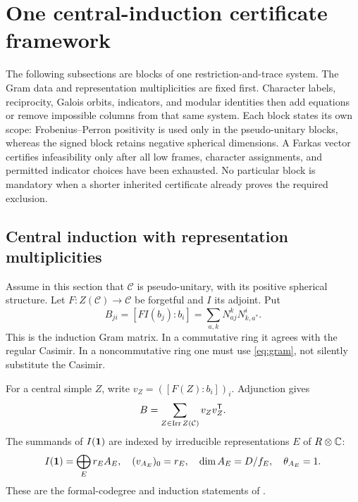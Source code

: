 \section{One central-induction certificate framework}\label{sec:unified-induction}
The following subsections are blocks of one restriction-and-trace system.
The Gram data and representation multiplicities are fixed first. Character
labels, reciprocity, Galois orbits, indicators, and modular identities then
add equations or remove impossible columns from that same system.
Each block states its own scope: Frobenius--Perron positivity is used only
in the pseudo-unitary blocks, whereas the signed block retains negative
spherical dimensions. A Farkas vector certifies infeasibility only after
all low frames, character assignments, and permitted indicator choices
have been exhausted. No particular block is mandatory when a shorter
inherited certificate already proves the required exclusion.

\subsection{Central induction with representation multiplicities}\label{sec:weighted}
Assume in this section that $\mathcal C$ is pseudo-unitary, with its
positive spherical structure. Let $F:Z(\mathcal C)\to\mathcal C$ be
forgetful and $I$ its adjoint. Put
\begin{equation}\label{eq:gram}
 B_{ji}=[FI(b_j):b_i]
 =\sum_{a,k}N_{aj}^{k}N_{k,a^*}^{i}.
\end{equation}
This is the induction Gram matrix. In a commutative ring it agrees with
the regular Casimir. In a noncommutative ring one must use
\eqref{eq:gram}, not silently substitute the Casimir.

For a central simple $Z$, write $v_Z=([F(Z):b_i])_i$. Adjunction gives
\begin{equation}\label{eq:fullgram}
 B=\sum_{Z\in\operatorname{Irr} Z(\mathcal C)}v_Zv_Z^{\mathsf T}.
\end{equation}
The summands of $I(\mathbf1)$ are indexed by irreducible representations
$E$ of $R\otimes\mathbb C$:
\begin{equation}\label{eq:weightedlow}
 I(\mathbf1)=\bigoplus_E r_E A_E,
 \quad (v_{A_E})_0=r_E,
 \quad \dim A_E=D/f_E,
 \quad \theta_{A_E}=1.
\end{equation}
These are the formal-codegree and induction statements of
\cite[Theorems~2.5,2.13]{Ostrik3}.

